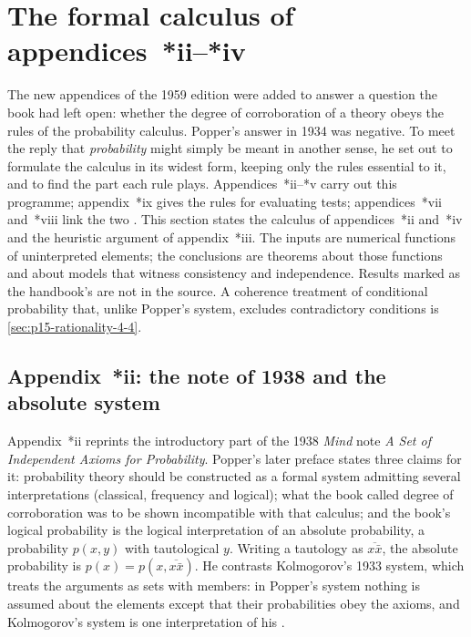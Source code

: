 \section{The formal calculus of appendices~*ii--*iv}
\label{sec:p15-w02b-p15-027-formal-calculus}

The new appendices of the 1959 edition were added to answer a question
the book had left open: whether the degree of corroboration of a theory
obeys the rules of the probability calculus. Popper's answer in 1934 was
negative. To meet the reply that \emph{probability} might simply be meant
in another sense, he set out to formulate the calculus in its widest
form, keeping only the rules essential to it, and to find the part each
rule plays. Appendices~*ii--*v carry out this programme; appendix~*ix
gives the rules for evaluating tests; appendices~*vii and~*viii link the
two \parencite[introductory note to the new appendices, pp.~310--311]{Popper2002LogicDiscoveryUI}.
This section states the calculus of appendices~*ii and~*iv and the
heuristic argument of appendix~*iii. The inputs are numerical functions
of uninterpreted elements; the conclusions are theorems about those
functions and about models that witness consistency and independence.
Results marked as the handbook's are not in the source. A coherence
treatment of conditional probability that, unlike Popper's system,
excludes contradictory conditions is \cref{sec:p15-rationality-4-4}.

\subsection{Appendix~*ii: the note of 1938 and the absolute system}

Appendix~*ii reprints the introductory part of the 1938 \emph{Mind} note
\emph{A Set of Independent Axioms for Probability}. Popper's later
preface states three claims for it: probability theory should be
constructed as a formal system admitting several interpretations
(classical, frequency and logical); what the book called degree of
corroboration was to be shown incompatible with that calculus; and the
book's logical probability is the logical interpretation of an absolute
probability, a probability \(p(x,y)\) with tautological \(y\). Writing a
tautology as \(\overline{x\bar x}\), the absolute probability is
\(p(x)=p(x,\overline{x\bar x})\). He contrasts Kolmogorov's 1933 system,
which treats the arguments as sets with members: in Popper's system
nothing is assumed about the elements except that their probabilities
obey the axioms, and Kolmogorov's system is one interpretation of his
\parencite[appendix~*ii, pp.~319--320]{Popper2002LogicDiscoveryUI}.

